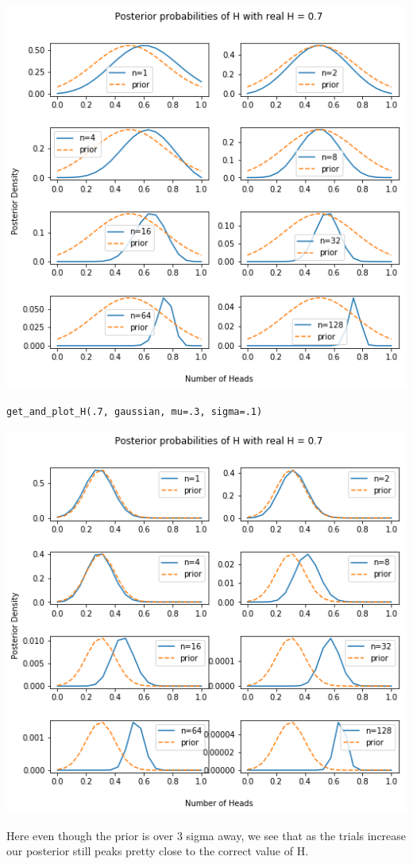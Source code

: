 \documentclass[11pt]{article}
\begin{document}
\includegraphics[width=.9\linewidth]{./obipy-resources/32249w.png}

\begin{verbatim}
get_and_plot_H(.7, gaussian, mu=.3, sigma=.1)
\end{verbatim}

\includegraphics[width=.9\linewidth]{./obipy-resources/3223RG.png}

Here even though the prior is over 3 sigma away, we see that as the trials
increase our posterior still peaks pretty close to the correct value of H.
\end{document}
